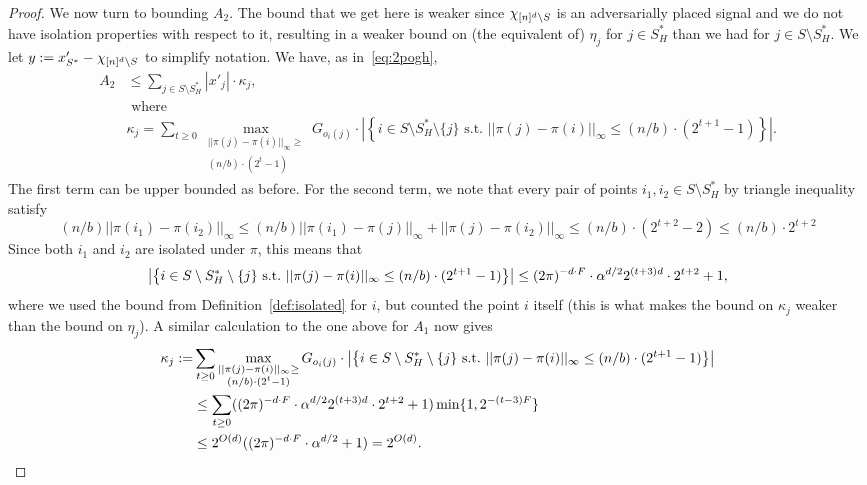 \begin{proof}
We now turn to bounding $A_2$. The bound that we get here is weaker since $\chi_{{[n]^d}\setminus S}$ is an adversarially placed signal and we do not have isolation properties with respect to it, resulting in a weaker bound on (the equivalent of) $\eta_j$ for $j\in S^*_H$ than we had for $j\in S\setminus S^*_H$.  We let $y:=x'_{S^*}-\chi_{{[n]^d}\setminus S}$ to simplify notation. We have, as in~\eqref{eq:2pogh},
\begin{equation*}
\begin{split}
A_2&\leq \sum_{j\in S\setminus S^*_H} |x'_j|\cdot \kappa_j,\\
& \text{~where~}\\
&\kappa_j=\sum_{t\geq 0} \max_{\substack{||\pi(j)-\pi(i)||_\infty\geq \\(n/b)\cdot (2^t-1)}} G_{o_i(j)}\cdot \left|\left\{i\in S\setminus S^*_H\setminus \{j\} \text{~s.t.~}||\pi(j)-\pi(i)||_\infty\leq (n/b)\cdot (2^{t+1}-1)\right\}\right|.
\end{split}
\end{equation*}
The first term can be upper bounded as before. For the second term, we note that every pair of points $i_1, i_2\in S\setminus S^*_H$ by triangle inequality satisfy 
$$
(n/b)||\pi(i_1)-\pi(i_2)||_\infty\leq (n/b)||\pi(i_1)-\pi(j)||_\infty+||\pi(j)-\pi(i_2)||_\infty\leq (n/b)\cdot (2^{t+2}-2)\leq (n/b)\cdot 2^{t+2}
$$ 
Since both $i_1$ and $i_2$ are isolated under $\pi$, this means that 
$$
\left|\left\{i\in S\setminus S^*_H\setminus \{j\} \text{~s.t.~}||\pi(j)-\pi(i)||_\infty\leq (n/b)\cdot (2^{t+1}-1)\right\}\right|\leq (2\pi)^{-d\cdot F}\cdot \alpha^{d/2} 2^{(t+3)d}\cdot 2^{t+2}+1,
$$
where we used the bound from Definition~\ref{def:isolated} for $i$, but counted the point $i$ itself (this is what makes the bound on $\kappa_j$ weaker than the bound on $\eta_j$). A similar calculation to the one above for $A_1$ now gives
\begin{equation*}
\begin{split}
\kappa_j:=&\sum_{t\geq 0} \max_{\substack{||\pi(j)-\pi(i)||_\infty\geq \\(n/b)\cdot (2^t-1)}} G_{o_i(j)}\cdot \left|\left\{i\in S\setminus S^*_H\setminus \{j\} \text{~s.t.~}||\pi(j)-\pi(i)||_\infty\leq (n/b)\cdot (2^{t+1}-1)\right\}\right|\\
&\leq \sum_{t\geq 0} ((2\pi)^{-d\cdot F}\cdot  \alpha^{d/2} 2^{(t+3)d}\cdot 2^{t+2}+1) \min\{1,  2^{-(t-3)F}\} \\
&\leq 2^{O(d)}((2\pi)^{-d\cdot F}\cdot \alpha^{d/2}+1)= 2^{O(d)}.
\end{split}
\end{equation*}

\end{proof}
